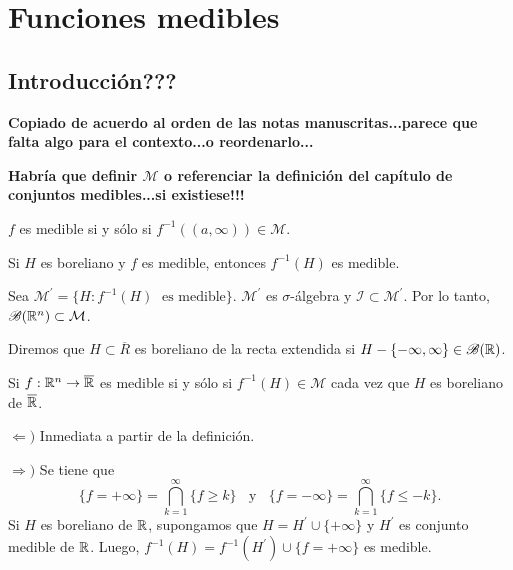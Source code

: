 \chapter{Funciones medibles
}

\section{Introducci\'on???}

\textbf{ Copiado de acuerdo al orden de las notas manuscritas...parece que falta algo para el contexto...o reordenarlo...}

\textbf{Habr\'ia que definir $\mathcal{M}$ o referenciar la definici\'on del cap\'itulo  de conjuntos medibles...si existiese!!!}

\begin{definicion}{}
$f$ es medible si y s\'olo si $f^{-1}((a,\infty)) \in \mathcal{M}$. 
\end{definicion}

\begin{teorema}{}
Si $H$ es boreliano y $f$ es medible, entonces $f^{-1}(H)$ es medible.
\end{teorema}

\begin{demo}{}
Sea $\mathcal{M}^{'}=\{ H: f^{-1}(H)\;\mbox{ es medible}\}$.
$\mathcal{M}^{'}$ es $\sigma$-\'algebra y $\mathscr{I}\subset \mathcal{M}^{'}$.
Por lo tanto, $\mathscr{B}(\mathbb{R}^n) \subset \mathcal{M}$.
\end{demo}

\begin{definicion}{}
Diremos que $H \subset \overline{R}$ es boreliano de la recta extendida si $H-\{ -\infty, \infty\} \in \mathscr{B}(\mathbb{R})$.
\end{definicion}

\begin{teorema}{}
Si $f:\mathbb{R}^n \to \overline{\mathbb{R}}$ es medible si y s\'olo si $f^{-1}(H) \in \mathcal{M}$ cada vez que $H$ es boreliano de $\overline{\mathbb{R}}$.
\end{teorema}

\begin{demo}
$\Leftarrow)$ Inmediata a partir de la definici\'on.

$\Rightarrow)$ Se tiene que 
\[
\{f=+\infty\}=\bigcap\limits_{k=1}^{\infty} \{f \geq k\}
\;\;\mbox{ y }\;\;
\{f=-\infty\}=\bigcap\limits_{k=1}^{\infty} \{f \leq -k\}.
\]
Si $H$ es boreliano de $\mathbb{R}$, supongamos que $H=H^{'}\cup \{+\infty\}$ y $H^{'}$ es conjunto medible de $\mathbb{R}$.
Luego, $f^{-1}(H)=f^{-1}(H^{'})\cup \{f=+\infty\}$ es medible.
\end{demo}


